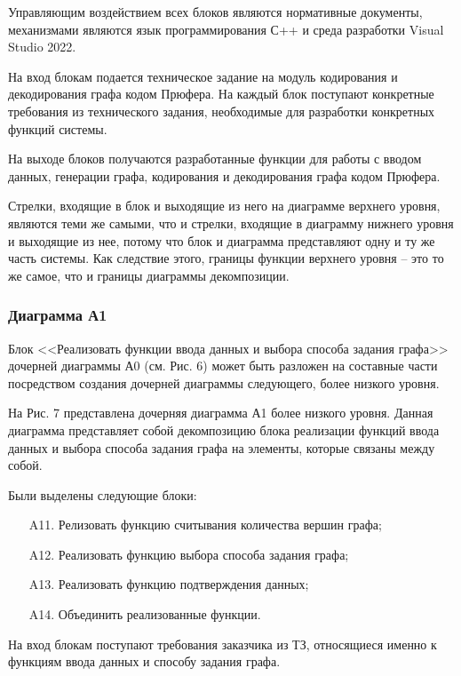 \documentclass[a4paper, final]{article}
\begin{document}
Управляющим воздействием всех блоков являются нормативные документы, механизмами являются язык программирования С++ 
и среда разработки Visual Studio 2022.

На вход блокам подается техническое задание на модуль кодирования и декодирования графа кодом Прюфера. На каждый 
блок поступают конкретные требования из технического задания, необходимые для разработки конкретных функций системы.

На выходе блоков получаются разработанные функции для работы с вводом данных, генерации графа, кодирования и декодирования графа кодом Прюфера.

Стрелки, входящие в блок и выходящие из него на диаграмме верхнего уровня, являются теми же самыми, что и стрелки, 
входящие в диаграмму нижнего уровня и выходящие из нее, потому что блок и диаграмма представляют одну и ту же 
часть системы. Как следствие этого, границы функции верхнего уровня -- это то же самое, что и границы диаграммы декомпозиции.

\newpage
\hypertarget{img:A0}{}



\subsubsection{Диаграмма А1}
Блок <<Реализовать функции ввода данных и выбора способа задания графа>> дочерней диаграммы А0 (см. Рис. 6) может быть разложен на составные части посредством создания дочерней диаграммы следующего, более низкого уровня.

На Рис. 7 представлена дочерняя диаграмма А1 более низкого уровня. Данная диаграмма представляет собой 
декомпозицию блока реализации функций ввода данных и выбора способа задания графа на элементы, которые связаны 
между собой. 

Были выделены следующие блоки:
\begin{itemize}
	\item[A11.] Релизовать функцию считывания количества вершин графа;
	\item[A12.] Реализовать функцию выбора способа задания графа;
	\item[A13.] Реализовать функцию подтверждения данных;
	\item[A14.] Объединить реализованные функции.
\end{itemize} 

На вход блокам поступают требования заказчика из ТЗ, относящиеся именно к функциям ввода данных и способу 
задания графа.
\end{document}
